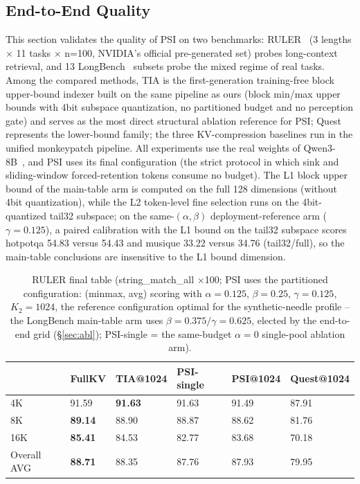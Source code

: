 \documentclass[11pt]{article}
\begin{document}
\subsection{End-to-End Quality}

This section validates the quality of PSI on two benchmarks: RULER~\cite{ruler} (3 lengths $\times$ 11 tasks $\times$ n=100, NVIDIA's official pre-generated set) probes long-context retrieval, and 13 LongBench~\cite{longbench} subsets probe the mixed regime of real tasks. Among the compared methods, TIA is the first-generation training-free block upper-bound indexer built on the same pipeline as ours (block min/max upper bounds with 4bit subspace quantization, no partitioned budget and no perception gate) and serves as the most direct structural ablation reference for PSI; Quest represents the lower-bound family; the three KV-compression baselines run in the unified monkeypatch pipeline. All experiments use the real weights of Qwen3-8B~\cite{qwen3}, and PSI uses its final configuration (the strict protocol in which sink and sliding-window forced-retention tokens consume no budget). The L1 block upper bound of the main-table arm is computed on the full 128 dimensions (without 4bit quantization), while the L2 token-level fine selection runs on the 4bit-quantized tail32 subspace; on the same-$(\alpha,\beta)$ deployment-reference arm ($\gamma{=}0.125$), a paired calibration with the L1 bound on the tail32 subspace scores hotpotqa 54.83 versus 54.43 and musique 33.22 versus 34.76 (tail32/full), so the main-table conclusions are insensitive to the L1 bound dimension.

\begin{table}[h]\centering
\caption{RULER final table (string\_match\_all $\times$100; PSI uses the partitioned configuration: (minmax, avg) scoring with $\alpha{=}0.125$, $\beta{=}0.25$, $\gamma{=}0.125$, $K_2{=}1024$, the reference configuration optimal for the synthetic-needle profile -- the LongBench main-table arm uses $\beta{=}0.375/\gamma{=}0.625$, elected by the end-to-end grid (\S\ref{sec:abl}); PSI-single = the same-budget $\alpha{=}0$ single-pool ablation arm).}
\begin{tabular}{llllll}
\toprule
 & FullKV & TIA@1024 & PSI-single & PSI@1024 & Quest@1024 \\
\midrule
4K & 91.59 & \textbf{91.63} & 91.63 & 91.49 & 87.91 \\
8K & \textbf{89.14} & 88.90 & 88.87 & 88.62 & 81.76 \\
16K & \textbf{85.41} & 84.53 & 82.77 & 83.68 & 70.18 \\
Overall AVG & \textbf{88.71} & 88.35 & 87.76 & 87.93 & 79.95 \\
\bottomrule
\end{tabular}
\end{table}
\end{document}
